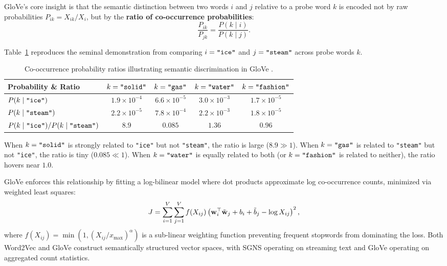 \documentclass[../../main.tex]{subfiles}
\begin{document}
GloVe's core insight is that the semantic distinction between two words $i$ and $j$ relative to a probe word $k$ is encoded not by raw probabilities $P_{ik} = X_{ik}/X_i$, but by the \textbf{ratio of co-occurrence probabilities}:
\begin{equation}
\label{eq:glove_ratio}
\frac{P_{ik}}{P_{jk}} = \frac{P(k \mid i)}{P(k \mid j)}.
\end{equation}

Table~\ref{tab:glove_ratio} reproduces the seminal demonstration from \cite{pennington2014glove} comparing $i = \text{\texttt{"ice"}}$ and $j = \text{\texttt{"steam"}}$ across probe words $k$.

\begin{table}[htbp]
\centering
\small
\caption{Co-occurrence probability ratios illustrating semantic discrimination in GloVe \cite{pennington2014glove}.}
\label{tab:glove_ratio}
\begin{tabular}{lcccc}
\toprule
\textbf{Probability \& Ratio} & $k = \text{\texttt{"solid"}}$ & $k = \text{\texttt{"gas"}}$ & $k = \text{\texttt{"water"}}$ & $k = \text{\texttt{"fashion"}}$ \\
\midrule
$P(k \mid \text{\texttt{"ice"\/}})$ & $1.9 \times 10^{-4}$ & $6.6 \times 10^{-5}$ & $3.0 \times 10^{-3}$ & $1.7 \times 10^{-5}$ \\
$P(k \mid \text{\texttt{"steam"\/}})$ & $2.2 \times 10^{-5}$ & $7.8 \times 10^{-4}$ & $2.2 \times 10^{-3}$ & $1.8 \times 10^{-5}$ \\
\midrule
$P(k \mid \text{\texttt{"ice"\/}}) / P(k \mid \text{\texttt{"steam"\/}})$ & $\mathbf{8.9}$ & $\mathbf{0.085}$ & $1.36$ & $0.96$ \\
\bottomrule
\end{tabular}
\end{table}

When $k = \text{\texttt{"solid"}}$ is strongly related to \texttt{"ice"} but not \texttt{"steam"}, the ratio is large ($8.9 \gg 1$). When $k = \text{\texttt{"gas"}}$ is related to \texttt{"steam"} but not \texttt{"ice"}, the ratio is tiny ($0.085 \ll 1$). When $k = \text{\texttt{"water"}}$ is equally related to both (or $k = \text{\texttt{"fashion"}}$ is related to neither), the ratio hovers near $1.0$.

GloVe enforces this relationship by fitting a log-bilinear model where dot products approximate log co-occurrence counts, minimized via weighted least squares:
\begin{equation}
\label{eq:glove_loss}
J = \sum_{i=1}^V \sum_{j=1}^V f(X_{ij}) \left( \mathbf{w}_i^\top \tilde{\mathbf{w}}_j + b_i + \tilde{b}_j - \log X_{ij} \right)^2,
\end{equation}
where $f(X_{ij}) = \min(1, (X_{ij}/x_{\max})^\alpha)$ is a sub-linear weighting function preventing frequent stopwords from dominating the loss. Both Word2Vec and GloVe construct semantically structured vector spaces, with SGNS operating on streaming text and GloVe operating on aggregated count statistics.
\end{document}
